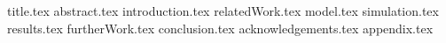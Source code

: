 \documentclass[11pt]{llncs}
\begin{document}
{title.tex}
\thispagestyle{plain}
{abstract.tex}
{introduction.tex}
{relatedWork.tex}
{model.tex}
{simulation.tex}
{results.tex}
{furtherWork.tex}
{conclusion.tex}
{acknowledgements.tex}
{appendix.tex}

\end{document}
